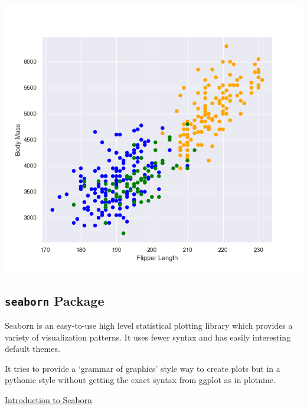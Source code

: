 \documentclass[
]{book}
\begin{document}
\begin{center}\includegraphics[width=0.9\linewidth]{fig/Viz_chap/1_matplot} \end{center}

\hypertarget{seaborn-package}{%
\subsection{\texorpdfstring{\texttt{seaborn} Package}{seaborn Package}}\label{seaborn-package}}

Seaborn is an easy-to-use high level statistical plotting library which provides a variety of visualization patterns. It uses fewer syntax and has easily interesting default themes.

It tries to provide a `grammar of graphics' style way to create plots but in a pythonic style without getting the exact syntax from ggplot as in plotnine.

\href{https://elitedatascience.com/python-seaborn-tutorial}{Introduction to Seaborn}
\end{document}
